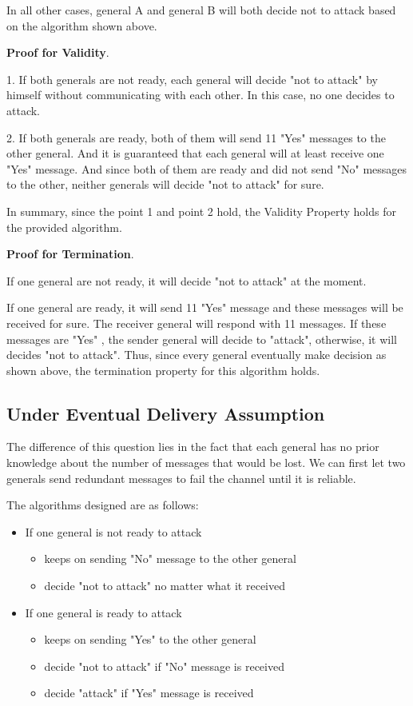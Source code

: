 \documentclass[11pt,a4paper]{article}
\begin{document}
In all other cases, general A and general B will both decide not to attack
based on the algorithm shown above.

\textbf{Proof for Validity}. 

1. If both generals are not ready, each general will decide "not to attack"
by himself without communicating with each other. In this case, no one decides
to attack.

2. If both generals are ready, both of them will send 11 "Yes" messages to the other
general. And it is guaranteed that each general will at least receive one
"Yes" message. And since both of them are ready and did not send "No" messages
to the other, neither generals will decide "not to attack" for sure. 

In summary, since the point 1 and point 2 hold, the Validity Property
holds for the provided algorithm.

\textbf{Proof for Termination}. 

If one general are not ready, it will decide "not to attack" at the moment. 

If one general are ready, it will send 11 "Yes" message and these messages
will be received for sure. The receiver general will respond with 11 messages.
If these messages are "Yes" , the sender general will decide to "attack",
otherwise, it will decides "not to attack".  Thus, since every general
eventually make decision as shown above, the termination property for this
algorithm holds. 

\newpage
\subsection{Under Eventual Delivery Assumption}
The difference of this question lies in the fact that each general has no
prior knowledge about the number of messages that would be lost. We can
first let two generals send redundant messages to fail the channel until it is
reliable. 

The algorithms designed are as follows:
\begin{itemize}
    \item{If one general is not ready to attack}
        \begin{itemize}
        \item{keeps on sending "No" message to the other general}
        \item{decide "not to attack" no matter what it received}
        \end{itemize}
    \item{If one general is ready to attack}
        \begin{itemize}
        \item{keeps on sending "Yes" to the other general}
        \item{decide "not to attack" if "No" message is received}
        \item{decide "attack" if "Yes" message is received}
        \end{itemize}
\end{itemize}
\end{document}
